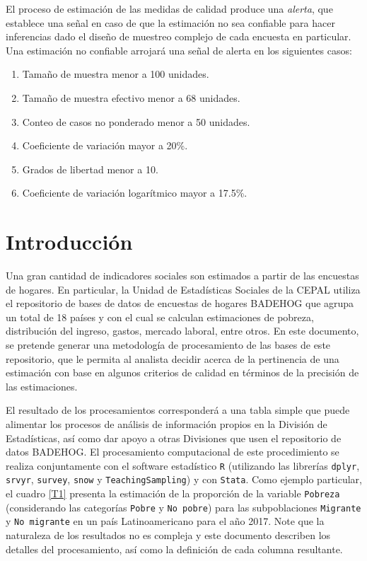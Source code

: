 \documentclass[
  12pt,
  spanish,
]{book}
\providecommand{\tightlist}{%
  \setlength{\itemsep}{0pt}\setlength{\parskip}{0pt}}
\begin{document}
El proceso de estimación de las medidas de calidad produce una \emph{alerta}, que establece una señal en caso de que la estimación no sea confiable para hacer inferencias dado el diseño de muestreo complejo de cada encuesta en particular. Una estimación no confiable arrojará una señal de alerta en los siguientes casos:

\begin{enumerate}
\def\labelenumi{\arabic{enumi}.}
\tightlist
\item
  Tamaño de muestra menor a 100 unidades.
\item
  Tamaño de muestra efectivo menor a 68 unidades.
\item
  Conteo de casos no ponderado menor a 50 unidades.
\item
  Coeficiente de variación mayor a 20\%.
\item
  Grados de libertad menor a 10.
\item
  Coeficiente de variación logarítmico mayor a 17.5\%.
\end{enumerate}

\hypertarget{introducciuxf3n-1}{%
\section{Introducción}\label{introducciuxf3n-1}}

Una gran cantidad de indicadores sociales son estimados a partir de las encuestas de hogares. En particular, la Unidad de Estadísticas Sociales de la CEPAL utiliza el repositorio de bases de datos de encuestas de hogares BADEHOG que agrupa un total de 18 países y con el cual se calculan estimaciones de pobreza, distribución del ingreso, gastos, mercado laboral, entre otros. En este documento, se pretende generar una metodología de procesamiento de las bases de este repositorio, que le permita al analista decidir acerca de la pertinencia de una estimación con base en algunos criterios de calidad en términos de la precisión de las estimaciones.

El resultado de los procesamientos corresponderá a una tabla simple que puede alimentar los procesos de análisis de información propios en la División de Estadísticas, así como dar apoyo a otras Divisiones que usen el repositorio de datos BADEHOG. El procesamiento computacional de este procedimiento se realiza conjuntamente con el software estadístico \texttt{R} (utilizando las librerías \texttt{dplyr}, \texttt{srvyr}, \texttt{survey}, \texttt{snow} y \texttt{TeachingSampling}) y con \texttt{Stata}. Como ejemplo particular, el cuadro \ref{T1} presenta la estimación de la proporción de la variable \texttt{Pobreza} (considerando las categorías \texttt{Pobre} y \texttt{No\ pobre}) para las subpoblaciones \texttt{Migrante} y \texttt{No\ migrante} en un país Latinoamericano para el año 2017. Note que la naturaleza de los resultados no es compleja y este documento describen los detalles del procesamiento, así como la definición de cada columna resultante.
\end{document}
